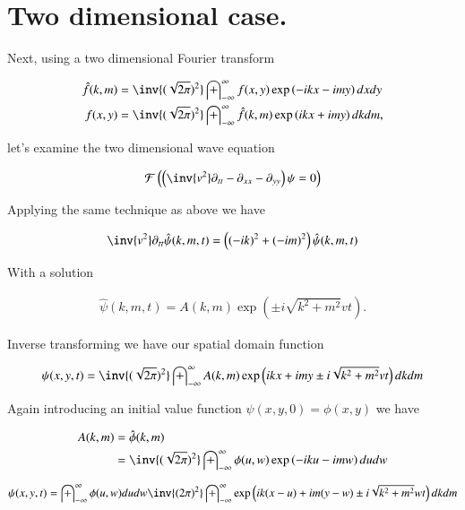 \documentclass{article}
\newcommand{\FF}[0]{\mathcal{F}}
\newcommand{\IIinf}[0]{ \int_{-\infty}^\infty }
\begin{document}
\section{ Two dimensional case. }

Next, using a two dimensional Fourier transform

\begin{align*}
\hat{f}(k,m) &= \inv{(\sqrt{2\pi})^2} \IIinf f(x,y) \exp\left( -i k x - i m y \right) dx dy \\
{f}(x,y) &= \inv{(\sqrt{2\pi})^2} \IIinf \hat{f}(k,m) \exp\left( i k x + i m y \right) dk dm,
\end{align*}

let's examine the two dimensional wave equation

\begin{align*}
\FF\left( \left(\inv{v^2} \partial_{tt} -\partial_{xx} -\partial_{yy} \right)\psi = 0 \right)
\end{align*}

Applying the same technique as above we have

\begin{align*}
\inv{v^2}\partial_{tt}\hat{\psi}(k,m,t) = \left((-i k)^2 + (-i m)^2\right) \hat{\psi}(k,m,t)
\end{align*}

With a solution 

\begin{align*}
\hat{\psi}(k,m,t) = A(k,m) \exp\left( \pm i \sqrt{k^2 + m^2} v t \right).
\end{align*}

Inverse transforming we have our spatial domain function

\begin{align*}
{\psi}(x,y,t) = \inv{(\sqrt{2\pi})^2} \IIinf A(k,m) \exp\left( i k x + i m y \pm i \sqrt{k^2 + m^2} v t \right) dk dm
\end{align*}

Again introducing an initial value function $\psi(x,y,0) = \phi(x,y)$ we have

\begin{align*}
A(k,m) 
&= \hat{\phi}(k,m) \\
&= \inv{(\sqrt{2\pi})^2} \IIinf \phi(u,w) \exp\left( -i k u - i m w \right) du dw
\end{align*}

\begin{align*}
{\psi}(x,y,t) 
&= \IIinf \phi(u,w) du dw \inv{({2\pi})^2} \IIinf \exp\left( i k (x-u) + i m (y-w) \pm i \sqrt{k^2 + m^2} w t \right) dk dm \\
\end{align*}
\end{document}
